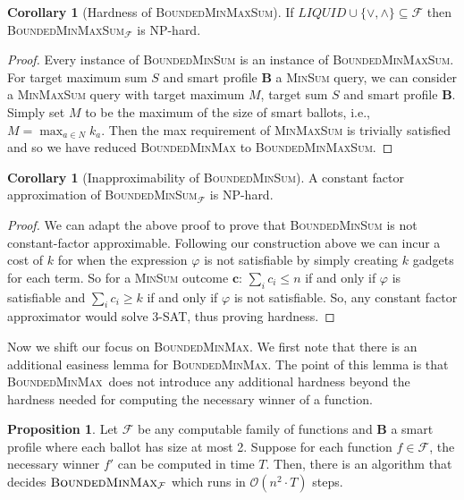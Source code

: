 \documentclass[11pt,a4paper, titlepage]{article}
\theoremstyle{definition}
\newtheorem{corollary}[theorem]{Corollary}
\newtheorem{proposition}[theorem]{Proposition}
\let\vec\mathbf
\newcommand{\BMM}{\textsc{BoundedMinMax}}
\begin{document}
\begin{corollary}[Hardness of \textsc{BoundedMinMaxSum}]
    If $ \mathit{LIQUID} \cup \{\lor, \land\} \subseteq \mathcal{F}$ then \textsc{BoundedMinMaxSum}$_\mathcal{F}$ is NP-hard. 
\end{corollary}

\begin{proof}
    Every instance of \textsc{BoundedMinSum} is an instance of \textsc{BoundedMinMaxSum}. For target maximum sum $S$ and smart profile $\vec{B}$ a \textsc{MinSum} query, we can consider a \textsc{MinMaxSum} query with target maximum $M$, target sum $S$ and smart profile $\vec{B}$. Simply set $M$ to be the maximum of the size of smart ballots, i.e., $M = \max_{a \in N} k_a$. Then the max requirement of \textsc{MinMaxSum} is trivially satisfied and so we have reduced \textsc{BoundedMinMax} to \textsc{BoundedMinMaxSum}.
\end{proof}


\begin{corollary}[Inapproximability of \textsc{BoundedMinSum}] A constant factor approximation of \textsc{BoundedMinSum}$_\mathcal{F}$ is NP-hard.    
\end{corollary}

\begin{proof}
    We can adapt the above proof to prove that \textsc{BoundedMinSum} is not constant-factor approximable. 
    Following our construction above we can incur a cost of $k$ for when the expression $\varphi$ is not satisfiable by simply creating $k$ gadgets for each term. 
    So for a \textsc{MinSum} outcome $\vec{c}$:   $\sum_i c_i \leq n$ if and only if $\varphi$ is satisfiable and $\sum_i c_i \geq k$ if and only if $\varphi$ is not satisfiable. 
    So, any constant factor approximator would solve \textsc{3-SAT}, thus proving hardness.
\end{proof}

Now we shift our focus on \textsc{BoundedMinMax}.
We first note that there is an additional easiness lemma for \BMM.
The point of this lemma is that \BMM\ does not introduce any additional hardness beyond the hardness needed for computing the necessary winner of a function.

\begin{proposition}
    Let $\mathcal{F}$ be any computable family of functions and $\vec{B}$ a smart profile where each ballot has size at most 2.
    Suppose for each function $f \in \mathcal{F}$, the necessary winner $f'$ can be computed in time $T$.
    Then, there is an algorithm that decides $\BMM_\mathcal{F}$ which runs in $\mathcal{O}(n^2\cdot T)$ steps. 
\end{proposition}
\end{document}

